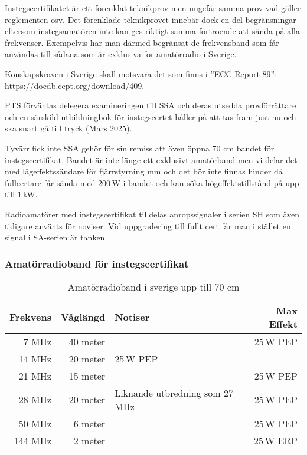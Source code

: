 Instegscertifikatet är ett förenklat teknikprov men ungefär samma prov
vad gäller reglementen osv. Det förenklade teknikprovet innebär dock
en del begränsningar eftersom instegsamatören inte kan ges riktigt
samma förtroende att sända på alla frekvenser. Exempelvis har man
därmed begränsat de frekvensband som får användas till sådana som är
exklusiva för amatörradio i Sverige.

Konskapskraven i Sverige skall motsvara det som finns i ''ECC Report 89'': \\
\url{https://docdb.cept.org/download/409}. 

PTS förväntas delegera examineringen till SSA och deras utsedda provförrättare 
och en särskild utbildningbok för instegscertet håller på att tas fram just 
nu och ska snart gå till tryck (Mars 2025).

Tyvärr fick inte SSA gehör för sin remiss att även öppna 70 cm bandet 
för instegscertifikat. Bandet är inte länge ett exklusivt amatörband 
men vi delar det med lågeffektssändare för fjärrstyrning mm och det
bör inte finnas hinder då fullcertare får sända med 200\,W i bandet och
kan söka högeffektstillstånd på upp till 1\,kW.

Radioamatörer med instegscertifikat tilldelas anropssignaler i serien SH 
som även tidigare använts för noviser. Vid uppgradering till fullt cert
får man i stället en signal i SA-serien är tanken.

\subsubsection{Amatörradioband för instegscertifikat}

\begin{table}[H]
\centering
\begin{tabular}{rrlr}
	\textbf{Frekvens} & \textbf{Våglängd} & \textbf{Notiser}               & \textbf{Max Effekt} \\ \hline
	            7 MHz &          40 meter &                                &           25\,W PEP \\
	           14 MHz &          20 meter & 25\,W PEP                      &                     \\
	           21 MHz &          15 meter &                                &           25\,W PEP \\
	           28 MHz &          20 meter & Liknande utbredning som 27 MHz &           25\,W PEP \\
	           50 MHz &           6 meter &                                &           25\,W PEP \\ \hline
	          144 MHz &           2 meter &                                &           25\,W ERP
\end{tabular}
\caption{Amatörradioband i sverige upp till 70 cm}
\end{table}

